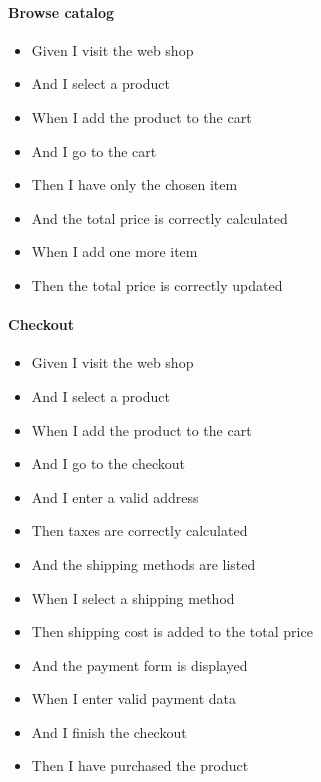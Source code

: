 \begin{appendices}
\paragraph{Browse catalog}
\begin{itemize}
	\item Given I visit the web shop
	\item And I select a product
	\item When I add the product to the cart
  	\item And I go to the cart
	\item Then I have only the chosen item
	\item And the total price is correctly calculated
	\item When I add one more item
	\item Then the total price is correctly updated
\end{itemize}

\paragraph{Checkout}
\begin{itemize}
	\item Given I visit the web shop
	\item And I select a product
	\item When I add the product to the cart
	\item And I go to the checkout
	\item And I enter a valid address
	\item Then taxes are correctly calculated
	\item And the shipping methods are listed
	\item When I select a shipping method
	\item Then shipping cost is added to the total price
	\item And the payment form is displayed
	\item When I enter valid payment data
	\item And I finish the checkout
	\item Then I have purchased the product
\end{itemize}


\end{appendices}
